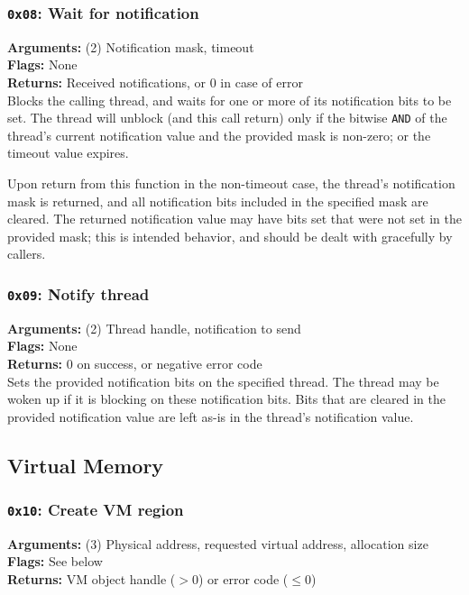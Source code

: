 \documentclass[11pt]{article}
\begin{document}
\subsubsection{{\tt 0x08}: Wait for notification}
\textbf{Arguments:} (2) Notification mask, timeout \\
\textbf{Flags:} None \\
\textbf{Returns:} Received notifications, or 0 in case of error \\

Blocks the calling thread, and waits for one or more of its notification bits to be set. The thread will unblock (and this call return) only if the bitwise \texttt{AND} of the thread's current notification value and the provided mask is non-zero; or the timeout value expires.

Upon return from this function in the non-timeout case, the thread's notification mask is returned, and all notification bits included in the specified mask are cleared. The returned notification value may have bits set that were not set in the provided mask; this is intended behavior, and should be dealt with gracefully by callers.

\subsubsection{{\tt 0x09}: Notify thread}
\textbf{Arguments:} (2) Thread handle, notification to send \\
\textbf{Flags:} None \\
\textbf{Returns:} 0 on success, or negative error code \\

Sets the provided notification bits on the specified thread. The thread may be woken up if it is blocking on these notification bits. Bits that are cleared in the provided notification value are left as-is in the thread's notification value.



\newpage
\subsection{Virtual Memory}
\subsubsection{{\tt 0x10}: Create VM region}
\textbf{Arguments:} (3) Physical address, requested virtual address, allocation size  \\
\textbf{Flags:} See below \\
\textbf{Returns:} VM object handle ($>0$) or error code ($\leq0$) \\
\end{document}
